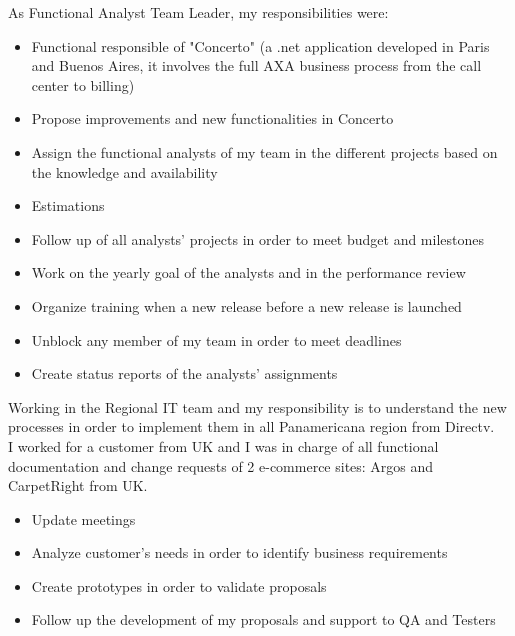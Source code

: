 \documentclass[11pt,a4paper,sans]{moderncv}
\begin{document}
As Functional Analyst Team Leader, my responsibilities were:
\begin{itemize}
  \item Functional responsible of "Concerto" (a .net application developed in Paris and Buenos Aires, it involves the full AXA business process from the call center to billing)
  \item Propose improvements and new functionalities in Concerto
  \item Assign the functional analysts of my team in the different projects based on the knowledge and availability
  \item Estimations
  \item Follow up of all analysts' projects in order to meet budget and milestones
  \item Work on the yearly goal of the analysts and in the performance review
  \item Organize training when a new release before a new release is launched
  \item Unblock any member of my team in order to meet deadlines
  \item Create status reports of the analysts' assignments
\newline{}
\newline
\end{itemize}


Working in the Regional IT team and my responsibility is to understand the new processes in order to implement them in all Panamericana region from Directv.
\\

I worked for a customer from UK and I was in charge of all functional documentation and change requests of 2 e-commerce sites: Argos and CarpetRight from UK.


\begin{itemize}
  \item Update meetings
  \item Analyze customer’s needs in order to identify business requirements
  \item Create prototypes in order to validate proposals
  \item Follow up the development of my proposals and support to QA and Testers
\newline
\newline
\end{itemize}
\end{document}
